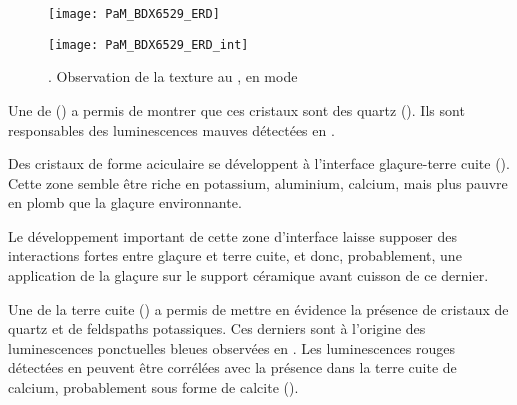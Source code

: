 \begin{figure}[htb]
  \setlength{\imgwidth}{7cm}
  \begin{minipage}[t]{\imgwidth}
    \centerfloat
    \texttt{[image: PaM\_BDX6529\_ERD]}%
  \end{minipage}%
  \hfill%
  \begin{minipage}[t]{\imgwidth}
    \centerfloat
    \texttt{[image: PaM\_BDX6529\_ERD\_int]}%
  \end{minipage}
  \caption[bdx{6529}\ -- Observation de la texture au \MEB, en mode \ERD]
          {\legendeB.
           Observation de la texture au \MEB, en mode \ERD%
          }
  \label{MEB:6529}
\end{figure}

Une \carto de \RX () a permis de montrer 
que ces cristaux sont des quartz (\quartz). Ils sont responsables 
des luminescences mauves détectées en \CL.

Des cristaux de forme aciculaire se développent à l'interface 
glaçure-terre cuite (). Cette zone semble être 
riche en potassium, aluminium, calcium, mais plus pauvre en plomb que 
la glaçure environnante.

Le développement important de cette zone d'interface laisse supposer 
des interactions fortes entre glaçure et terre cuite, et donc, 
probablement, une application de la glaçure sur le support céramique 
avant cuisson de ce dernier.

Une \carto de la terre cuite () a permis de 
mettre en évidence la présence de cristaux de quartz et de feldspaths 
potassiques. Ces derniers sont à l'origine des luminescences 
ponctuelles bleues observées en \CL. Les luminescences rouges 
détectées en \CL peuvent être corrélées avec la présence dans la terre 
cuite de calcium, probablement sous forme de calcite (\calcite).

